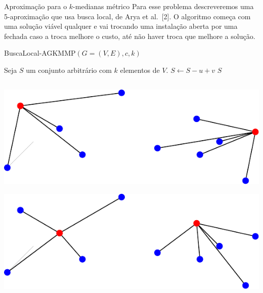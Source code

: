 \documentclass[final]{beamer}
\begin{document}
\begin{frame}[t]
\begin{columns}[t]
\begin{column}{0.47\paperwidth}
\begin{block}{Aproximação para o $k$-medianas métrico}
    Para esse problema descreveremos uma 5-aproximação que usa busca local, de Arya et al.\ [2]. O algoritmo começa com uma solução viável qualquer e vai trocando uma instalação aberta por uma fechada caso a troca melhore o custo, até não haver troca que melhore a solução.
    \begin{shaded}
      \vspace{-.65cm}
      \begin{algorithm}[H]
        \caption{BuscaLocal-AGKMMP$(G = (V,E),c,k)$}
              \begin{algorithmic}[1]
            \State Seja $S$ um conjunto arbitrário com $k$ elementos de $V$.
            \State $S \gets S - u + v$
            \EndWhile
            \State\Return $S$
          \end{algorithmic}
      \end{algorithm}
      \vspace{-.65cm}
      \end{shaded}


      \begin{columns}
        \begin{column}{0.23\paperwidth}
        
            \begin{tcolorbox}
              \includegraphics[scale=1.2]{imgs/local-search2.pdf}
            \end{tcolorbox}
            
            \begin{tcolorbox}
              \includegraphics[scale=1.2]{imgs/local-search4.pdf}
            \end{tcolorbox}
         \end{column}


\end{columns}
\end{block}
\end{column}
\end{columns}
\end{frame}
\end{document}

